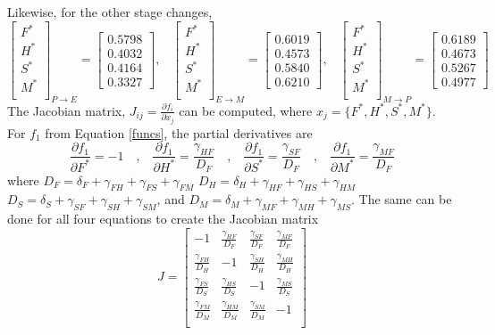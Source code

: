 \documentclass[11pt]{article}
\begin{document}
Likewise, for the other stage changes,
\[\begin{bmatrix}
F^*\\H^*\\S^*\\M^*\\
\end{bmatrix}_{P \to E} = 
\begin{bmatrix}
0.5798\\0.4032\\0.4164\\0.3327
\end{bmatrix}
\text{,} \quad
\begin{bmatrix}
F^*\\H^*\\S^*\\M^*\\
\end{bmatrix}_{E \to M} = 
\begin{bmatrix}
0.6019\\0.4573\\0.5840\\0.6210
\end{bmatrix}
\text{,} \quad
\begin{bmatrix}
F^*\\H^*\\S^*\\M^*\\
\end{bmatrix}_{M \to P} = 
\begin{bmatrix}
0.6189\\0.4673\\0.5267\\0.4977
\end{bmatrix}\]
The Jacobian matrix, $J_{ij}=\frac{\partial f_i}{\partial x_j}$ can be computed, where $x_j=\{F^*, H^*, S^*,M^*\}$. For $f_1$ from Equation \ref{funcs}, the partial derivatives are
\[
\frac{\partial f_1}{\partial F^*}=-1
\quad \text{,} \quad
\frac{\partial f_1}{\partial H^*}=\frac{\gamma_{HF}}{D_F}
\quad \text{,} \quad
\frac{\partial f_1}{\partial S^*}=\frac{\gamma_{SF}}{D_F}
\quad \text{,} \quad
\frac{\partial f_1}{\partial M^*}=\frac{\gamma_{MF}}{D_F}
\]
\noindent where
$D_F=\delta_F+\gamma_{FH}+\gamma_{FS}+\gamma_{FM}$
$D_H=\delta_H+\gamma_{HF}+\gamma_{HS}+\gamma_{HM}$
$D_S=\delta_S+\gamma_{SF}+\gamma_{SH}+\gamma_{SM}$, and
$D_M=\delta_M+\gamma_{MF}+\gamma_{MH}+\gamma_{MS}$.
The same can be done for all four equations to create the Jacobian matrix
\[J=\begin{bmatrix}
-1 & \frac{\gamma_{HF}}{D_F} & \frac{\gamma_{SF}}{D_F} & \frac{\gamma_{MF}}{D_F}\\
\frac{\gamma_{FH}}{D_H} & -1 & \frac{\gamma_{SH}}{D_H} & \frac{\gamma_{MH}}{D_H}\\
\frac{\gamma_{FS}}{D_S} & \frac{\gamma_{HS}}{D_S} & -1 & \frac{\gamma_{MS}}{D_S}\\
\frac{\gamma_{FM}}{D_M} & \frac{\gamma_{HM}}{D_M} & \frac{\gamma_{SM}}{D_M} & -1\\
\end{bmatrix}\]
\end{document}
